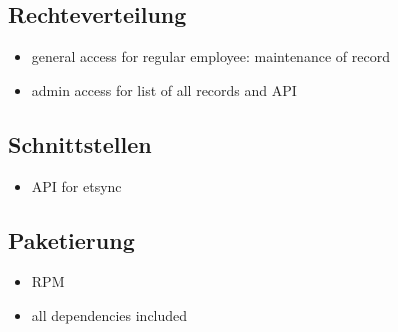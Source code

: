 \subsection{Rechteverteilung}
\label{sec:Rechteverteilung}
\begin{itemize}
	\item general access for regular employee: maintenance of record
	\item admin access for list of all records and API
\end{itemize}

\subsection{Schnittstellen}
\label{sec:Schnittstellen}
\begin{itemize}
	\item API for etsync
\end{itemize}

\subsection{Paketierung}
\label{sec:Paketierung}
\begin{itemize}
	\item RPM
	\item all dependencies included
\end{itemize}
